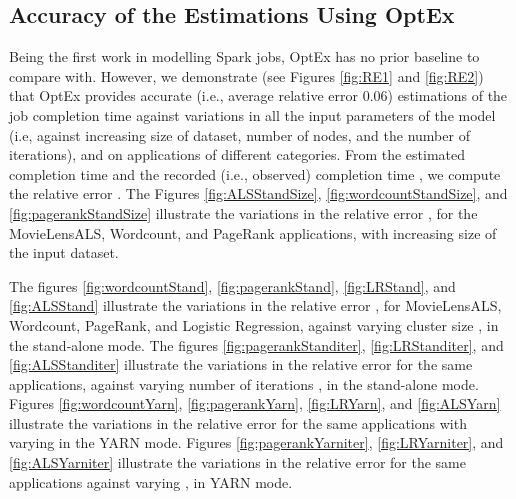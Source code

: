 \documentclass[conference]{IEEEtran}
\begin{document}
\subsection{Accuracy of the Estimations Using OptEx}\label{sec:eval}

















Being the first work in modelling Spark jobs, OptEx has no prior baseline to compare with. However,
    we demonstrate (see Figures \ref{fig:RE1} and \ref{fig:RE2}) that OptEx provides accurate (i.e., average relative error 0.06) estimations of the job completion time against variations
    in all the input parameters of the model (i.e, against increasing size of dataset, number of nodes, and the
    number of iterations), and on applications of different categories. From the estimated completion time  and the recorded (i.e., observed) completion time
 , we compute the relative error
 .
The Figures \ref{fig:ALSStandSize}, \ref{fig:wordcountStandSize}, and \ref{fig:pagerankStandSize} illustrate
 the variations in the relative error , for the MovieLensALS, Wordcount, and PageRank
   applications, with increasing size  of the input dataset.
    \par The figures \ref{fig:wordcountStand}, \ref{fig:pagerankStand}, \ref{fig:LRStand}, and \ref{fig:ALSStand} illustrate the variations in the relative error  , for MovieLensALS, Wordcount, PageRank, and Logistic Regression, against
 varying cluster size , in the
 stand-alone mode. The figures \ref{fig:pagerankStanditer}, \ref{fig:LRStanditer}, and \ref{fig:ALSStanditer} illustrate the variations in the relative error   for the same applications, against varying
 number of iterations , in the
 stand-alone mode. Figures \ref{fig:wordcountYarn}, \ref{fig:pagerankYarn}, \ref{fig:LRYarn}, and \ref{fig:ALSYarn} illustrate the variations in  the relative error  for the same applications with varying  in the  YARN mode.  Figures \ref{fig:pagerankYarniter},
 \ref{fig:LRYarniter}, and \ref{fig:ALSYarniter} illustrate the variations in the relative error  for the same applications against varying , in
 YARN mode.
\end{document}
